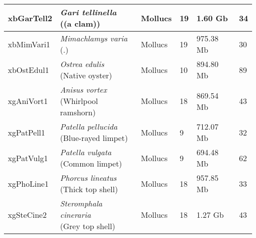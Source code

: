 \begin{centering}
\begin{longtable}{l|l|l|l|l|l}
xbGarTell2 & \makecell[{l}]{\textit{Gari tellinella} \\ ((a clam))} & Mollucs & 19 & 1.60 Gb & 34  \\ \hline
xbMimVari1 & \makecell[{l}]{\textit{Mimachlamys varia} \\ (.)} & Mollucs & 19 & 975.38 Mb & 30  \\ \hline
xbOstEdul1 & \makecell[{l}]{\textit{Ostrea edulis} \\ (Native oyster)} & Mollucs & 10 & 894.80 Mb & 89  \\ \hline
xgAniVort1 & \makecell[{l}]{\textit{Anisus vortex} \\ (Whirlpool ramshorn)} & Mollucs & 18 & 869.54 Mb & 43  \\ \hline
xgPatPell1 & \makecell[{l}]{\textit{Patella pellucida} \\ (Blue-rayed limpet)} & Mollucs & 9 & 712.07 Mb & 32  \\ \hline
xgPatVulg1 & \makecell[{l}]{\textit{Patella vulgata} \\ (Common limpet)} & Mollucs & 9 & 694.48 Mb & 62  \\ \hline
xgPhoLine1 & \makecell[{l}]{\textit{Phorcus lineatus} \\ (Thick top shell)} & Mollucs & 18 & 957.85 Mb & 33  \\ \hline
xgSteCine2 & \makecell[{l}]{\textit{Steromphala cineraria} \\ (Grey top shell)} & Mollucs & 18 & 1.27 Gb & 43  \\ \hline
\end{longtable}
\end{centering}
\endgroup
